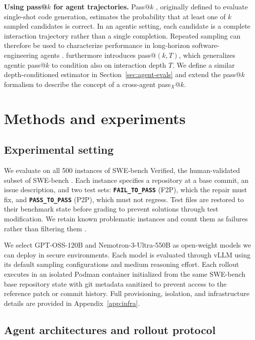 \documentclass{article}
\begin{document}
\textbf{Using pass@\(k\) for agent trajectories.} Pass@\(k\) \cite{chen2021codex}, originally defined to evaluate single-shot code generation, estimates the probability that at least one of \(k\) sampled candidates is correct. In an agentic setting, each candidate is a complete interaction trajectory rather than a single completion. Repeated sampling can therefore be used to characterize performance in long-horizon software-engineering agents \cite{yang2024sweagent,pan2025swegym, bjarnason2026randomness, zhai2026doesrlexpandcapability}. \cite{zhai2026doesrlexpandcapability} furthermore introduces pass@$(k,T)$, which generalizes agentic pass@$k$ to condition also on interaction depth $T$. We define a similar depth-conditioned estimator in Section~\ref{sec:agent-evals} and extend the pass@$k$ formalism to describe the concept of a {cross-agent} pass$_X$@$k$. 


\section{Methods and experiments}

\subsection{Experimental setting}
We evaluate on all 500 instances of SWE-bench Verified, the human-validated subset of SWE-bench \cite{jimenez2024swebench}. Each instance specifies a repository at a base commit, an issue description, and two test sets: \texttt{\textbf{FAIL\_TO\_PASS}} (F2P), which the repair must fix, and \texttt{\textbf{PASS\_TO\_PASS}} (P2P), which must not regress. Test files are restored to their benchmark state before grading to prevent solutions through test modification. We retain known problematic instances and count them as failures rather than filtering them \cite{openai2026swebench}.

We select GPT-OSS-120B \citep{openai2025gptoss} and Nemotron-3-Ultra-550B \citep{nvidia2026nemotron3ultra} as open-weight models we can deploy in secure environments. Each model is evaluated through vLLM using its default sampling configurations and medium reasoning effort. Each rollout executes in an isolated Podman container initialized from the same SWE-bench base repository state with git metadata sanitized to prevent access to the reference patch or commit history. Full provisioning, isolation, and infrastructure details are provided in Appendix~\ref{app:infra}.

\subsection{Agent architectures and rollout protocol}
\end{document}
